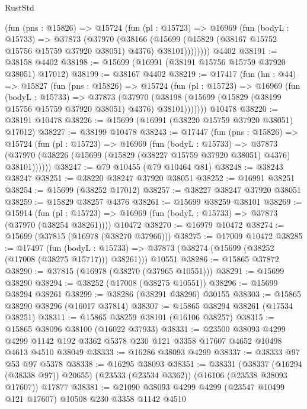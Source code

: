 \begin{lexlean}{RustStd}
\begin{coremodule}
        (fun (pns : @15826) =>
        @15724
          (fun (pl : @15723) =>
          @16969
            (fun (bodyL : @15733) =>
            @37873
              (@37970
                (@38166
                  (@15699 (@15829 (@38167 @15752 @15756 @15759 @37920 @38051) @4376) @38101))))))))
    @4402
@38191 := @38158 @4402
@38198 := @15699 (@16991 (@38191 @15756 @15759 @37920 @38051) @17012)
@38199 := @38167 @4402
@38219 := @17417
    (fun (hn : @44) =>
    @15827
      (fun (pns : @15826) =>
      @15724
        (fun (pl : @15723) =>
        @16969
          (fun (bodyL : @15733) =>
          @37873
            (@37970
              (@38198 (@15699 (@15829 (@38199 @15756 @15759 @37920 @38051) @4376) @38101)))))))
    @10478
@38220 := @38191 @10478
@38226 := @15699 (@16991 (@38220 @15759 @37920 @38051) @17012)
@38227 := @38199 @10478
@38243 := @17447
    (fun (pns : @15826) =>
    @15724
      (fun (pl : @15723) =>
      @16969
        (fun (bodyL : @15733) =>
        @37873 (@37970 (@38226 (@15699 (@15829 (@38227 @15759 @37920 @38051) @4376) @38101))))))
@38247 := @79 @10455 (@79 @10464 @81)
@38248 := @38243 @38247
@38251 := @38220 @38247 @37920 @38051
@38252 := @16991 @38251
@38254 := @15699 (@38252 @17012)
@38257 := @38227 @38247 @37920 @38051
@38259 := @15829 @38257 @4376
@38261 := @15699 @38259 @38101
@38269 := @15914
    (fun (pl : @15723) => @16969 (fun (bodyL : @15733) => @37873 (@37970 (@38254 @38261))))
    @10472
@38270 := @16979 @10472
@38274 := @15699 (@37815 (@16978 (@38270 @37966)))
@38275 := @17009 @10472
@38285 := @17497
    (fun (bodyL : @15733) => @37873 (@38274 (@15699 (@38252 (@17008 (@38275 @15717))) @38261)))
    @10551
@38286 := @15865 @37872
@38290 := @37815 (@16978 (@38270 (@37965 @10551)))
@38291 := @15699 @38290
@38294 := @38252 (@17008 (@38275 @10551))
@38296 := @15699 @38294 @38261
@38299 := @38286 (@38291 @38296) @30155
@38303 := @15865 @38290 @38296 (@16017 @37814)
@38307 := @15865 @38294 @38261 (@17534 @38251)
@38311 := @15865 @38259 @38101 (@16106 @38257)
@38315 := @15865 @38096 @38100 (@16022 @37933)
@38331 := @23500
    @38093
    @4299
    @4299
    @1142
    @192
    @3362
    @5378
    @230
    @121
    @3358
    @17607
    @4652
    @10498
    @4613
    @4510
    @38049
@38333 := @16286 @38093 @4299
@38337 := @38333 @97 @53 @97 @5378
@38338 := @16295 @38093
@38351 := @38331
    (@38337 (@16294 (@38338 @97)) @20655)
    (@23533 (@23534 @3362))
    (@16106 (@23538 @38093 @17607))
    @17877
@38381 := @21090
    @38093
    @4299
    @4299
    (@23547 @10499 @121 @17607)
    @10508
    @230
    @3358
    @1142
    @4510

\end{coremodule}
\end{lexlean}
